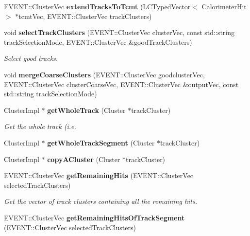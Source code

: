 \begin{DoxyCompactItemize}
\item 
E\-V\-E\-N\-T\-::\-Cluster\-Vec {\bfseries extend\-Tracks\-To\-Tcmt} (L\-C\-Typed\-Vector$<$ Calorimeter\-Hit $>$ $\ast$tcmt\-Vec, E\-V\-E\-N\-T\-::\-Cluster\-Vec track\-Clusters)\label{classCALICE_1_1AngleTrackFinder_a184c520d08cc8dde4c813bc44784ca52}

\item 
void {\bf select\-Track\-Clusters} (E\-V\-E\-N\-T\-::\-Cluster\-Vec cluster\-Vec, const std\-::string track\-Selection\-Mode, E\-V\-E\-N\-T\-::\-Cluster\-Vec \&good\-Track\-Clusters)
\begin{DoxyCompactList}\small\item\em Select good tracks. \end{DoxyCompactList}\item 
void {\bfseries merge\-Coarse\-Clusters} (E\-V\-E\-N\-T\-::\-Cluster\-Vec goodcluster\-Vec, E\-V\-E\-N\-T\-::\-Cluster\-Vec cluster\-Coarse\-Vec, E\-V\-E\-N\-T\-::\-Cluster\-Vec \&output\-Vec, const std\-::string track\-Selection\-Mode)\label{classCALICE_1_1AngleTrackFinder_ad57cb7c54e211b1f6c79904a45611903}

\item 
Cluster\-Impl $\ast$ {\bf get\-Whole\-Track} (Cluster $\ast$track\-Cluster)
\begin{DoxyCompactList}\small\item\em Get the whole track (i.\-e. \end{DoxyCompactList}\item 
Cluster\-Impl $\ast$ {\bfseries get\-Whole\-Track\-Segment} (Cluster $\ast$track\-Cluster)\label{classCALICE_1_1AngleTrackFinder_a30c444b8e888a60ca81305ddadda9c83}

\item 
Cluster\-Impl $\ast$ {\bfseries copy\-A\-Cluster} (Cluster $\ast$track\-Cluster)\label{classCALICE_1_1AngleTrackFinder_a0769f3c37445bf0e8efce89f90049814}

\item 
E\-V\-E\-N\-T\-::\-Cluster\-Vec {\bf get\-Remaining\-Hits} (E\-V\-E\-N\-T\-::\-Cluster\-Vec selected\-Track\-Clusters)
\begin{DoxyCompactList}\small\item\em Get the vector of track clusters containing all the remaining hits. \end{DoxyCompactList}\item 
E\-V\-E\-N\-T\-::\-Cluster\-Vec {\bfseries get\-Remaining\-Hits\-Of\-Track\-Segment} (E\-V\-E\-N\-T\-::\-Cluster\-Vec selected\-Track\-Clusters)\label{classCALICE_1_1AngleTrackFinder_a13fdc56df9fcf40ed6bd8dad70ee200e}


\end{DoxyCompactItemize}
